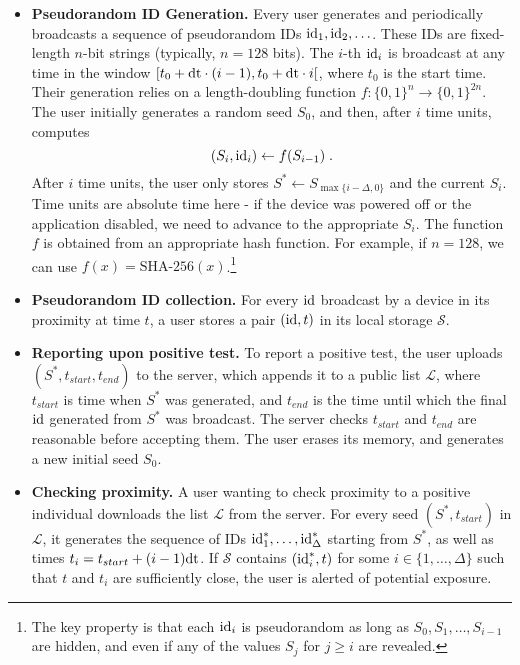 \documentclass{article}
\newcommand{\TODO}[1]{ {\color{blue} #1 }}
\begin{document}
\begin{itemize}
    \item {\bf Pseudorandom ID Generation.} Every user generates and periodically broadcasts a sequence of pseudorandom IDs $\mathrm{id}_1, \mathrm{id}_2, \ldots$. These IDs are fixed-length $n$-bit strings (typically, $n = 128$ bits). The $i$-th $\mathrm{id}_i$ is broadcast at any time in the window $[t_0 + \mathrm{dt}\cdot (i-1), t_0 + \mathrm{dt}\cdot i[$, where $t_0$ is the start time. Their generation relies on a length-doubling function $f: \{0,1\}^n \to \{0,1\}^{2n}$. The user initially generates a random seed $S_0$, and then, after $i$ time units, computes
\begin{displaymath}
(S_i, \mathrm{id}_i) \gets f(S_{i-1}) \;.
\end{displaymath}
After $i$ time units, the user only stores $S^* \gets S_{\max\{i-\Delta,0\}}$ and the current $S_i$. Time units are absolute time here - if the device was powered off or the application disabled, we need to advance to the appropriate $S_i$. The function $f$ is obtained from an appropriate hash function. For example, if $n = 128$, we can use $f(x) = \textrm{SHA-256}(x)$.\footnote{The key property is that each $\mathrm{id}_i$ is pseudorandom  as long as $S_0, S_1, \ldots, S_{i-1}$ are hidden, and even if any of the values $S_j$ for $j \geq i$ are revealed.}

\item {\bf Pseudorandom ID collection.} For every $\mathrm{id}$ broadcast by a device in its proximity at time $t$, a user stores a pair $(\mathrm{id}, t)$ in its local storage $\mathcal{S}$.
\item {\bf Reporting upon positive test.} To report a positive test, the user uploads $(S^*, t_{start}, t_{end})$ to the server, which appends it to a public list $\mathcal{L}$, where $t_{start}$ is time when $S^*$ was generated, and $t_{end}$ is the time until which the final $\mathrm{id}$ generated from $S^*$ was broadcast. The server checks $t_{start}$ and $t_{end}$ are reasonable before accepting them. The user erases its memory, and generates a new initial seed $S_0$. 
\item {\bf Checking proximity.} A user wanting to check proximity to a positive individual downloads the list $\mathcal{L}$ from the server. For every seed $(S^*,t_{start})$ in $\mathcal{L}$, it generates the sequence of IDs $\mathrm{id}^*_1, \ldots, \mathrm{id}^*_{\Delta}$ starting from $S^*$, as well as times $t_i = t_{start} + (i-1) \mathrm{dt}$. If $\mathcal{S}$ contains $(\mathrm{id}_i^*, t)$ for some $i \in \{1, \ldots, \Delta\}$ such that $t$ and $t_i$ are sufficiently close, the user is alerted of potential exposure.
\end{itemize}
\end{document}

